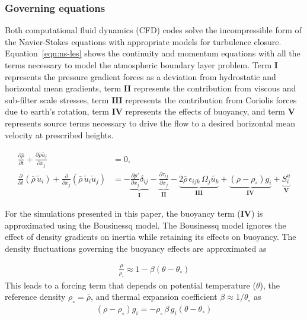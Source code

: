 
\subsubsection{Governing equations}
Both computational fluid dynamics (CFD) codes solve the incompressible form of
the Navier-Stokes equations with appropriate models for turbulence
closure. Equation~\ref{eqn:ns-les} shows the continuity and momentum equations
with all the terms necessary to model the atmospheric boundary layer
problem. Term $\mathbf{I}$ represents the pressure gradient forces as a
deviation from hydrostatic and horizontal mean gradients, term $\mathbf{II}$
represents the contribution from viscous and sub-filter scale stresses, term
$\mathbf{III}$ represents the contribution from Coriolis forces due to earth's
rotation, term $\mathbf{IV}$ represents the effects of buoyancy, and term
$\mathbf{V}$ represents source terms necessary to drive the flow to a desired
horizontal mean velocity at prescribed heights.

\begin{align}
  \frac{\partial \bar{\rho}} {\partial t} + \frac{\partial \bar{\rho} \widetilde{u_j}}{\partial x_j} & = 0, \nonumber\\
  \frac{\partial}{\partial t} \left(\bar{\rho}\, \widetilde{u}_i\right) +
  \frac{\partial}{\partial x_j} \left( \bar{\rho}\, \widetilde{u}_i \widetilde{u}_j \right) &=
  - \underbrace{\frac{\partial p'}{\partial x_j} \delta_{ij}}_\mathbf{I}
  - \underbrace{\frac{\partial \tau_{ij}}{\partial x_j}}_\mathbf{II}
  - \underbrace{2\bar{\rho}\,\epsilon_{ijk}\,\Omega_j\widetilde{u_k}}_\mathbf{III}
  + \underbrace{\left(\rho - \rho_\circ \right) g_i}_\mathbf{IV}
  + \underbrace{S^{u}_{i}}_\mathbf{V} \label{eqn:ns-les}
\end{align}

For the simulations presented in this paper, the buoyancy term ($\mathbf{IV}$)
is approximated using the Bousinessq model. The Bousinessq model ignores the
effect of density gradients on inertia while retaining its effects on buoyancy.
The density fluctuations governing the buoyancy effects are approximated as

\begin{align}
  \frac{\rho}{\rho_\circ} \approx 1 - \beta \left( \theta - \theta_\circ \right)
\end{align}
This leads to a forcing term that depends on potential temperature ($\theta$),
the reference density $\rho_\circ = \bar{\rho}$, and thermal expansion
coefficient $\beta \approx 1 / \theta_\circ$ as
\begin{align}
  \left(\rho - \rho_\circ \right) g_i = -\rho_\circ\, \beta\, g_i \left( \theta - \theta_\circ \right)
\end{align}

